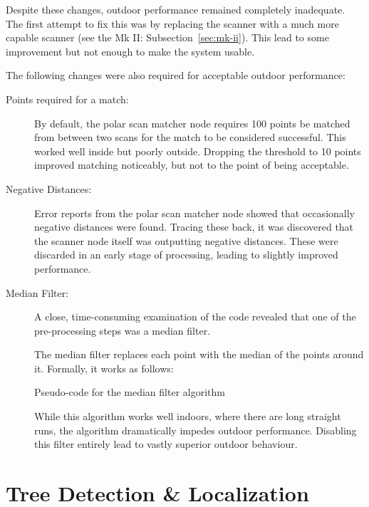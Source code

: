 \documentclass[12pt,oneside,a4paper]{book}
\begin{document}
Despite these changes, outdoor performance remained completely
inadequate. The first attempt to fix this was by replacing the scanner
with a much more capable scanner (see the Mk II:
Subsection~\ref{sec:mk-ii}). This lead to some improvement but not
enough to make the system usable.

The following changes were also required for acceptable outdoor
performance:

\begin{description}
\item[Points required for a match:] By default, the polar scan matcher
  node requires 100 points be matched from between two scans for the
  match to be considered successful. This worked well inside but
  poorly outside. Dropping the threshold to 10
  points improved matching noticeably, but not to the point of being
  acceptable.
\item[Negative Distances:] Error reports from the polar scan matcher node
  showed that occasionally negative distances were found. Tracing
  these back, it was discovered that the scanner node itself was
  outputting negative distances. These were discarded in an early
  stage of processing, leading to slightly improved performance.
\item[Median Filter:] A close, time-consuming examination of the code
  revealed that one of the pre-processing steps was a median filter.

  The median filter replaces each point with the median of the points
  around it. Formally, it works as follows:
  \IncMargin{1em}
  \begin{algorithm}
    \BlankLine
    \caption{Pseudo-code for the median filter algorithm}
  \end{algorithm}

  While this algorithm works well indoors, where there are long
  straight runs, the algorithm dramatically impedes outdoor
  performance. Disabling this filter entirely lead to vastly superior
  outdoor behaviour.
\end{description}


\section{Tree Detection \& Localization}
\label{sec:tree-detection-localization}
\end{document}
